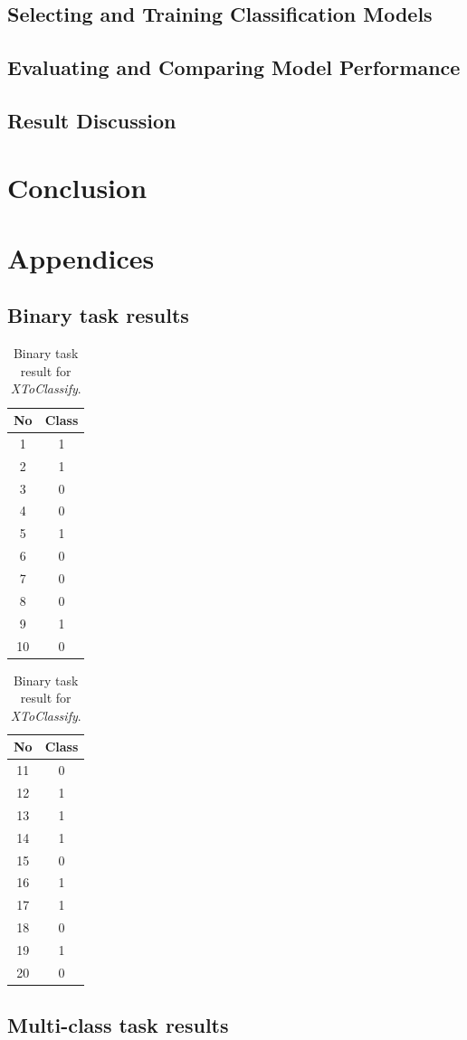 \documentclass[11pt]{article}
\begin{document}
		\subsection{Selecting and Training Classification Models}
		\subsection{Evaluating and Comparing Model Performance}
		\subsection{Result Discussion}
	\section{Conclusion}

	\clearpage
	\appendix
	\section{Appendices}
		\subsection{Binary task results}
		\begin{center}
		  	\begin{table}[h]
		  		\small

		  	\centering

			\begin{tabular}[b]{| c | c|} 
				\hline
				No & Class \\
				\hline
				1 & 1 \\ 2 & 1 \\ 3 & 0 \\ 4 & 0 \\ 5 & 1 \\ 6 & 0 \\ 7 & 0 \\ 8 & 0 \\ 9 & 1 \\ 10 & 0 \\
				\hline
			\end{tabular}
			\begin{tabular}[b]{| c | c|} 
				\hline
				No & Class \\
				\hline
				11 & 0 \\ 12 & 1 \\ 13 & 1 \\ 14 & 1 \\ 15 & 0 \\ 16 & 1 \\ 17 & 1 \\ 18 & 0 \\ 19 & 1 \\ 20 & 0 \\
				\hline
			\end{tabular}
			\caption{Binary task result for \textit{XToClassify}.}
			\label{tbl:final_binary}
			\end{table}
		\end{center}
		\subsection{Multi-class task results}
\end{document}
